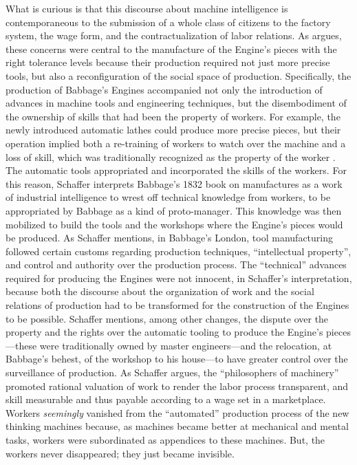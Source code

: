 \documentclass[version=last,draft=false,paper=A4,portrait,twoside=true,twocolumn=false,headinclude=false,footinclude=false,mpinclude=true,fontsize=12,BCOR=20mm,DIV=calc,pagesize=auto,open=right,chapterprefix=true,numbers=autoendperiod,headsepline=false,headings=twolinechapter,parskip=false]{scrbook}
\begin{document}
What is curious is that this discourse about machine intelligence is
contemporaneous to the submission of a whole class of citizens to the
factory system, the wage form, and the contractualization of labor
relations. As \textcite{schaffer1994} argues, these concerns were central to
the manufacture of the Engine's pieces with the right tolerance levels
because their production required not just more precise tools, but also a
reconfiguration of the social space of production. Specifically, the
production of Babbage's Engines accompanied not only the introduction of
advances in machine tools and engineering techniques, but the disembodiment
of the ownership of skills that had been the property of workers. For
example, the newly introduced automatic lathes could produce more precise
pieces, but their operation implied both a re-training of workers to watch
over the machine and a loss of skill, which was traditionally recognized as
the property of the worker \autocite[214]{schaffer1994}. The automatic
tools appropriated and incorporated the skills of the workers. For this
reason, Schaffer interprets Babbage's 1832 book on manufactures as a work
of industrial intelligence to wrest off technical knowledge from workers,
to be appropriated by Babbage as a kind of proto-manager. This knowledge
was then mobilized to build the tools and the workshops where the Engine's
pieces would be produced. As Schaffer mentions, in Babbage's London, tool
manufacturing followed certain customs regarding production techniques,
``intellectual property'', and control and authority over the production
process. The ``technical'' advances required for producing the Engines were
not innocent, in Schaffer's interpretation, because both the discourse
about the organization of work and the social relations of production had
to be transformed for the construction of the Engines to be possible.
Schaffer mentions, among other changes, the dispute over the property and
the rights over the automatic tooling to produce the Engine's
pieces---these were traditionally owned by master engineers---and the
relocation, at Babbage's behest, of the workshop to his house---to have
greater control over the surveillance of production. As Schaffer argues,
the ``philosophers of machinery'' promoted rational valuation of work to
render the labor process transparent, and skill measurable and thus payable
according to a wage set in a marketplace. Workers \emph{seemingly} vanished from
the ``automated'' production process of the new thinking machines because,
as machines became better at mechanical and mental tasks, workers were
subordinated as appendices to these machines. But, the workers never
disappeared; they just became invisible.
\end{document}
